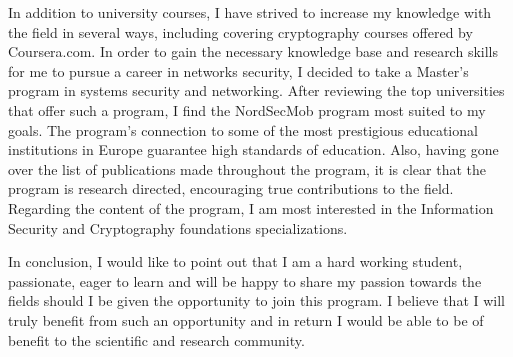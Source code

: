\documentclass[10pt,stdletter,dateno,sigleft]{newlfm} %
\begin{document}
\begin{newlfm}
  In addition to university courses, I have strived to increase my knowledge
  with the field in several ways, including covering cryptography courses
  offered by Coursera.com. In order to gain the necessary knowledge base and
  research skills for me to pursue a career in networks security, I decided to
  take a Master's program in systems security and networking. After reviewing
  the top universities that offer such a program, I find the NordSecMob program
  most suited to my goals. The program's connection to some of the most
  prestigious educational institutions in Europe guarantee high standards of
  education. Also, having gone over the list of publications made
  throughout the program, it is clear that the program is research directed,
  encouraging true contributions to the field. Regarding the content of the
  program, I am most interested in the Information Security and Cryptography
  foundations specializations.
  
  In conclusion, I would like to point out that I am a hard working student,
  passionate, eager to learn and will be happy to share my passion towards the
  fields should I be given the  opportunity to join this program. I believe
  that I will truly benefit from
  such an opportunity and in return I would be able to be of benefit to the
  scientific and research community.

\end{newlfm}
\end{document}
